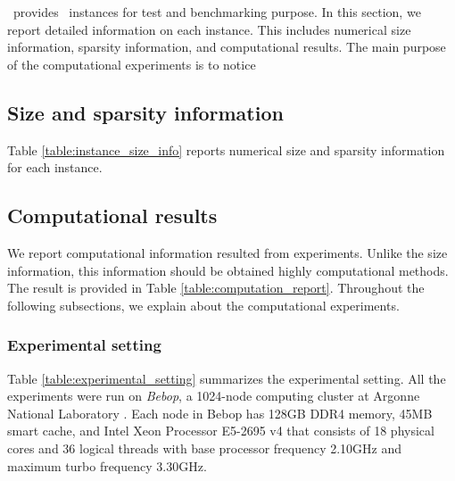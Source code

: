 %
%

\siplibtwo\ provides \smps\ instances for test and benchmarking  purpose. In this section, we report detailed information on each instance. This includes numerical size information, sparsity information, and computational results. The main purpose of the computational experiments is to notice 

\subsection{Size and sparsity information}
Table \ref{table:instance_size_info} reports numerical size and sparsity information for each instance.


\subsection{Computational results}
We report computational information resulted from experiments. Unlike the size information, this information should be obtained highly computational methods. The result is provided in Table \ref{table:computation_report}. Throughout the following subsections, we explain about the computational experiments.

\subsubsection{Experimental setting}
Table \ref{table:experimental_setting} summarizes the experimental setting. All the experiments were run on \textit{Bebop}, a 1024-node computing cluster at Argonne National Laboratory \cite{bebop}. Each node in Bebop has 128GB DDR4 memory, 45MB smart cache, and Intel Xeon Processor E5-2695 v4 that consists of 18 physical cores and 36 logical threads with base processor frequency 2.10GHz and maximum turbo frequency 3.30GHz. 

